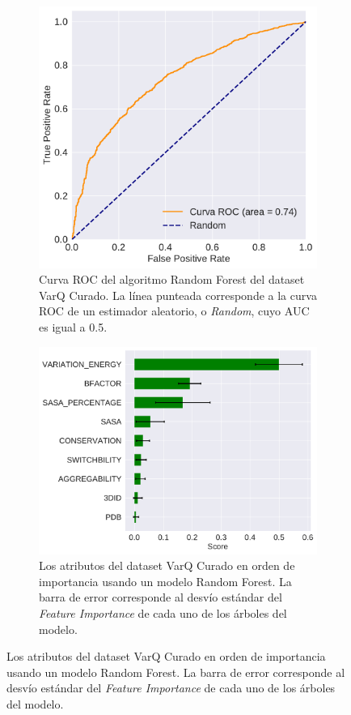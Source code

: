 \begin{figure}[H]
\centering
\begin{subfigure}{0.7\textwidth}
    \includegraphics[width=\textwidth]{documents/latex/figures/3/varq/auc_varq.pdf}
    \caption{Curva ROC del algoritmo Random Forest del dataset VarQ Curado. La línea punteada corresponde a la curva ROC de un estimador aleatorio, o \textit{Random}, cuyo AUC es igual a 0.5.}
    \label{fig:auc_varq}
\end{subfigure}
\begin{subfigure}{0.7\textwidth}
    \includegraphics[width=\textwidth]{documents/latex/figures/3/varq/importances_varq.pdf}
    \caption{Los atributos del dataset VarQ Curado en orden de importancia usando un modelo Random Forest. La barra de error corresponde al desvío estándar del \textit{Feature Importance} de cada uno de los árboles del modelo.}
    \label{fig:importance_varq}
\end{subfigure}
\end{figure}

